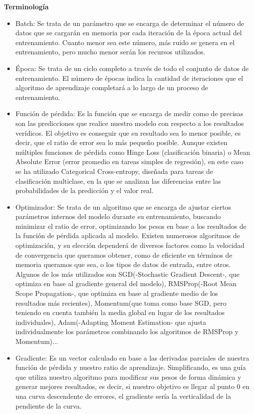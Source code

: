 \documentclass{article}
\begin{document}
\noindent\textbf{Terminología}
\begin{itemize}
	\item Batch: Se trata de un parámetro que se encarga de determinar el número de datos que se cargarán en memoria por cada iteración de la época actual del entrenamiento. Cuanto menor sea este número, más ruido se genera en el entrenamiento, pero mucho menor serán los recursos utilizados.
	\item Época: Se trata de un ciclo completo a través de todo el conjunto de datos de entrenamiento. El número de épocas indica la cantidad de iteraciones que el algoritmo de aprendizaje completará a lo largo de un proceso de entrenamiento.
	\item Función de pérdida: Es la función que se encarga de medir como de precisas son las predicciones que realice nuestro modelo con respecto a los resultados verídicos. El objetivo es conseguir que su resultado sea lo menor posible, es decir, que el ratio de error sea lo más pequeño posible. Aunque existen múltiples funciones de pérdida como Hinge Loss (clasificación binaria) o Mean Absolute Error (error promedio en tareas simples de regresión), en este caso se ha utilizado Categorical Cross-entropy, diseñada para tareas de clasificación multiclase, en la que se analizan las diferencias entre las probabilidades de la predicción y el valor real.
	\item Optimizador: Se trata de un algoritmo que se encarga de ajustar ciertos parámetros internos del modelo durante su entrenamiento, buscando minimizar el ratio de error, optimizando los pesos en base a los resultados de la función de pérdida aplicada al modelo. Existen numerosos algoritmos de optimización, y su elección dependerá de diversos factores como la velocidad de convergencia que queramos obtener, como de eficiente en términos de memoria queramos que sea, o los tipos de datos de entrada, entre otros. Algunos de los más utilizados son SGD(-Stochastic Gradient Descent-, que optimiza en base al gradiente general del modelo), RMSProp(-Root Mean Scope Propagation-, que optimiza en base al gradiente medio de los resultados más recientes), Momentum(que toma como base SGD, pero teniendo en cuenta también la media global en lugar de los resultados individuales), Adam(-Adapting Moment Estimation- que ajusta individualmente los parámetros combinando los algoritmos de RMSProp y Momentum)...
	\item Gradiente: Es un vector calculado en base a las derivadas parciales de nuestra función de pérdida y nuestro ratio de aprendizaje. Simplificando, es una guía que utiliza nuestro algoritmo para modificar sus pesos de forma dinámica y generar mejores resultados, es decir, si nuestro objetivo es llegar al punto 0 en una curva descendente de errores, el gradiente sería la verticalidad de la pendiente de la curva.


\end{itemize}
\end{document}
